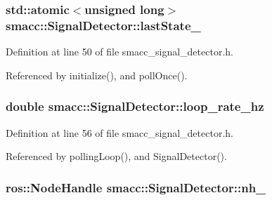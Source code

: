 \subsubsection[{\texorpdfstring{last\+State\+\_\+}{lastState_}}]{\setlength{\rightskip}{0pt plus 5cm}std\+::atomic$<$unsigned long$>$ smacc\+::\+Signal\+Detector\+::last\+State\+\_\+\hspace{0.3cm}{\ttfamily [private]}}\hypertarget{classsmacc_1_1SignalDetector_a72293ed0e98f4200fbe75b53f1e41eab}{}\label{classsmacc_1_1SignalDetector_a72293ed0e98f4200fbe75b53f1e41eab}


Definition at line 50 of file smacc\+\_\+signal\+\_\+detector.\+h.



Referenced by initialize(), and poll\+Once().

\subsubsection[{\texorpdfstring{loop\+\_\+rate\+\_\+hz}{loop_rate_hz}}]{\setlength{\rightskip}{0pt plus 5cm}double smacc\+::\+Signal\+Detector\+::loop\+\_\+rate\+\_\+hz\hspace{0.3cm}{\ttfamily [private]}}\hypertarget{classsmacc_1_1SignalDetector_a41a2ae4262ed350f46d8b886bdc1dfa5}{}\label{classsmacc_1_1SignalDetector_a41a2ae4262ed350f46d8b886bdc1dfa5}


Definition at line 56 of file smacc\+\_\+signal\+\_\+detector.\+h.



Referenced by polling\+Loop(), and Signal\+Detector().

\subsubsection[{\texorpdfstring{nh\+\_\+}{nh_}}]{\setlength{\rightskip}{0pt plus 5cm}ros\+::\+Node\+Handle smacc\+::\+Signal\+Detector\+::nh\+\_\+\hspace{0.3cm}{\ttfamily [private]}}\hypertarget{classsmacc_1_1SignalDetector_a5c416677fd537afc79f2fbc2e68b2dee}{}\label{classsmacc_1_1SignalDetector_a5c416677fd537afc79f2fbc2e68b2dee}


